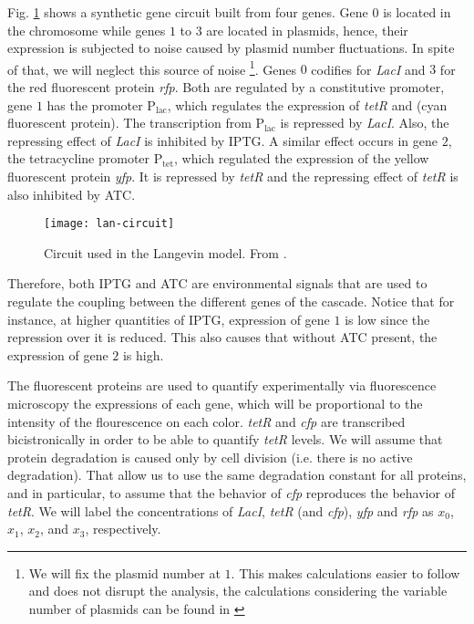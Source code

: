 Fig. \ref{fig:lan-circuit} shows a synthetic gene circuit built from four genes. Gene $0$ is located in the chromosome while genes $1$ to $3$ are located in plasmids, hence, their expression is subjected to noise caused by plasmid number fluctuations. In spite of that, we will neglect this source of noise \footnote{We will fix the plasmid number at $1$. This makes calculations easier to follow and does not disrupt the analysis, the calculations considering the variable number of plasmids can be found in \cite{pedraza05}}. Genes $0$ codifies for \textit{LacI} and $3$ for the red fluorescent protein \textit{rfp}. Both are regulated by a constitutive promoter, gene $1$ has the promoter P$_\text{lac}$, which regulates the expression of \textit{tetR} and  (cyan fluorescent protein). The transcription from P$_\text{lac}$ is repressed by \textit{LacI}. Also, the repressing effect of \textit{LacI} is inhibited by IPTG. A similar effect occurs in gene $2$, the tetracycline promoter P$_\text{tet}$, which regulated the expression of the yellow fluorescent protein \textit{yfp}. It is repressed by \textit{tetR} and the repressing effect of \textit{tetR} is also inhibited by ATC.
\begin{figure}[H]
  \centering
  \texttt{[image: lan-circuit]}
  \caption[Circuit used for the Langevin model]{\label{fig:lan-circuit} Circuit used in the Langevin model. From \cite{pedraza05}.}
\end{figure}

Therefore, both IPTG and ATC are environmental signals that are used to regulate the coupling between the different genes of the cascade. Notice that for instance, at higher quantities of IPTG, expression of gene $1$ is low since the repression over it is reduced. This also causes that without ATC present, the expression of gene $2$ is high. 

The fluorescent proteins are used to quantify experimentally via fluorescence microscopy the expressions of each gene, which will be proportional to the intensity of the flourescence on each color. \textit{tetR} and \textit{cfp} are transcribed bicistronically in order to be able to quantify \textit{tetR} levels. We will assume that protein degradation is caused only by cell division (i.e. there is no active degradation). That allow us to use the same degradation constant for all proteins, and in particular, to assume that the behavior of \textit{cfp} reproduces the behavior of \textit{tetR}. We will label the concentrations of \textit{LacI}, \textit{tetR} (and \textit{cfp}), \textit{yfp} and \textit{rfp} as $x_0$, $x_1$, $x_2$, and $x_3$, respectively.

